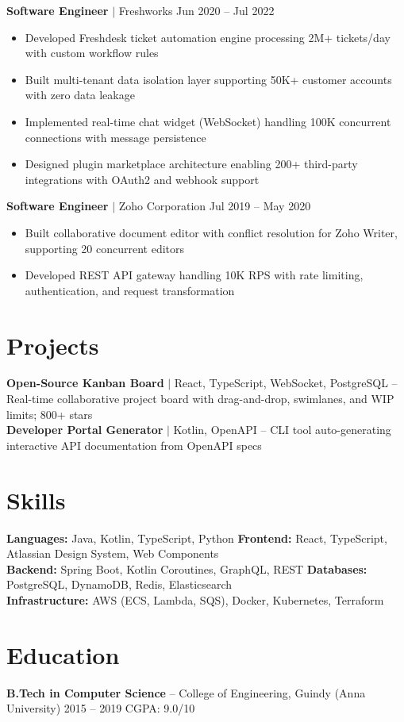 \documentclass[10pt,a4paper]{article}
\begin{document}
\textbf{Software Engineer} $\mid$ Freshworks \hfill {\small Jun 2020 -- Jul 2022}
\begin{itemize}
    \item Developed Freshdesk ticket automation engine processing 2M+ tickets/day with custom workflow rules
    \item Built multi-tenant data isolation layer supporting 50K+ customer accounts with zero data leakage
    \item Implemented real-time chat widget (WebSocket) handling 100K concurrent connections with message persistence
    \item Designed plugin marketplace architecture enabling 200+ third-party integrations with OAuth2 and webhook support
\end{itemize}

\textbf{Software Engineer} $\mid$ Zoho Corporation \hfill {\small Jul 2019 -- May 2020}
\begin{itemize}
    \item Built collaborative document editor with conflict resolution for Zoho Writer, supporting 20 concurrent editors
    \item Developed REST API gateway handling 10K RPS with rate limiting, authentication, and request transformation
\end{itemize}

\section{Projects}

{\color{accent}} \textbf{Open-Source Kanban Board} {\small$\mid$ React, TypeScript, WebSocket, PostgreSQL} -- Real-time collaborative project board with drag-and-drop, swimlanes, and WIP limits; 800+ stars\\[3pt]
{\color{accent}} \textbf{Developer Portal Generator} {\small$\mid$ Kotlin, OpenAPI} -- CLI tool auto-generating interactive API documentation from OpenAPI specs

\section{Skills}

{\small
\textbf{Languages:} Java, Kotlin, TypeScript, Python \quad \textbf{Frontend:} React, TypeScript, Atlassian Design System, Web Components\\
\textbf{Backend:} Spring Boot, Kotlin Coroutines, GraphQL, REST \quad \textbf{Databases:} PostgreSQL, DynamoDB, Redis, Elasticsearch\\
\textbf{Infrastructure:} AWS (ECS, Lambda, SQS), Docker, Kubernetes, Terraform
}

\section{Education}

{\color{accent}} \textbf{B.Tech in Computer Science} -- College of Engineering, Guindy (Anna University) \hfill 2015 -- 2019 \quad CGPA: 9.0/10
\end{document}
